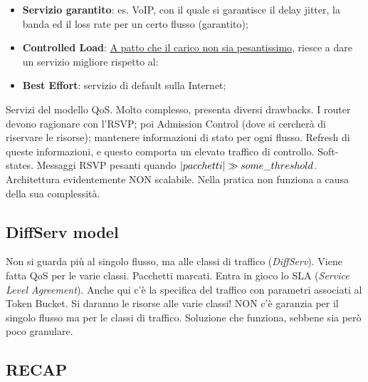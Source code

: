 \begin{itemize}

\item{\textbf{Servizio garantito}}: es. VoIP, con il quale si garantisce il delay jitter, la banda ed il loss rate per un certo flusso (garantito); 
\item{\textbf{Controlled Load}}: \underline{A patto che il carico non sia pesantissimo}, riesce a dare un servizio migliore rispetto al:
\item{\textbf{Best Effort}}: servizio di default sulla Internet;
\end{itemize}

Servizi del modello QoS. Molto complesso, presenta diversi drawbacks. I router devono ragionare con l'RSVP; poi Admission Control (dove si cercherà di riservare le risorse); mantenere informazioni di stato per ogni flusso. Refresh di queste informazioni, e questo comporta un elevato traffico di controllo. Soft-states. Messaggi RSVP pesanti quando $\left\vert{pacchetti}\right\vert \gg some\_threshold$. Architettura evidentemente NON scalabile. Nella pratica non funziona a causa della sua complessità. 

\subsection{DiffServ model}

Non si guarda più al singolo flusso, ma alle classi di traffico (\textit{DiffServ}). Viene fatta QoS per le varie classi. Pacchetti marcati. Entra in gioco lo SLA (\textit{Service Level Agreement}). Anche qui c'è la specifica del traffico con parametri associati al Token Bucket. Si daranno le risorse alle varie classi! NON c'è garanzia per il singolo flusso ma per le classi di traffico. Soluzione che funziona, sebbene sia però poco granulare.

\subsection{RECAP}

